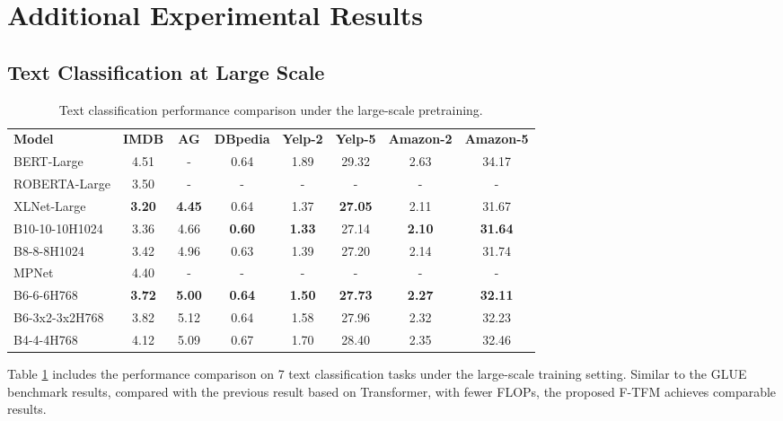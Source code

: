 \documentclass{article}
\theoremstyle{custom}
\begin{document}
\section{Additional Experimental Results}
\label{sec:appendix-extra-exp}

\subsection{Text Classification at Large Scale}
\label{sec:appendix-textcls}
\begin{table}[!ht]
	\centering
	\begin{tabular}{lccccccc}
		\toprule
		\bf Model & \bf IMDB & \bf AG & \bf DBpedia & \bf Yelp-2 & \bf Yelp-5 & \bf Amazon-2 & \bf Amazon-5 \\
		\cmidrule(r){1-1} \cmidrule(l){2-8}
		BERT-Large
		& 4.51 & - & 0.64 & 1.89 & 29.32 & 2.63 & 34.17 \\
		ROBERTA-Large
		& 3.50 & - & -    & -    & -     & -    & -     \\
		XLNet-Large
		& \bf 3.20 & \bf 4.45 & 0.64 & 1.37 & \bf 27.05 & 2.11 & 31.67 \\
		B10-10-10H1024
		& 3.36 & 4.66 & \bf 0.60 & \bf 1.33 & 27.14 & \bf 2.10 & \bf 31.64 \\
		B8-8-8H1024
		& 3.42 & 4.96 & 0.63 & 1.39 & 27.20 & 2.14 & 31.74 \\
		\cmidrule(r){1-1} \cmidrule(l){2-8}
		MPNet
		& 4.40 & -  & -     & -   & -   & -     & -  \\
		B6-6-6H768
		& \bf 3.72 & \bf 5.00 & \bf 0.64 & \bf 1.50 & \bf 27.73 \bf & \bf 2.27 & \bf 32.11 \\
		B6-3x2-3x2H768
		& 3.82 & 5.12 & 0.64 & 1.58 & 27.96 & 2.32 & 32.23 \\
		B4-4-4H768
		& 4.12 & 5.09 & 0.67 & 1.70 & 28.40 & 2.35 & 32.46 \\  
		\bottomrule 
	\end{tabular}
	\caption{Text classification performance comparison under the large-scale pretraining.}
	\label{tab:large-scale-textcls}
\end{table}
Table \ref{tab:large-scale-textcls} includes the performance comparison on 7 text classification tasks under the large-scale training setting.
Similar to the GLUE benchmark results, compared with the previous result based on Transformer, with fewer FLOPs, the proposed F-TFM achieves comparable results.
\end{document}
